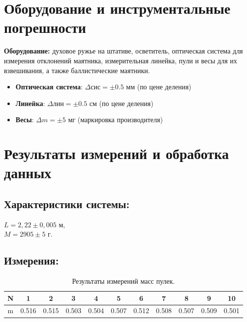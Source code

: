 \documentclass[
	a4paper, %
	12pt, %
]{article}
\begin{document}
	\section{Оборудование и инструментальные погрешности}
	\textbf{Оборудование:} духовое ружье на штативе, осветитель, оптическая система для измерения отклонений маятника, измерительная линейка, пули и весы для их взвешивания, а также баллистические маятники.
	\begin{itemize}
		\item \textbf{Оптическая система}: $\Delta \text{сис} = \pm0.5$ мм (по цене деления)
		\item \textbf{Линейка}: $\Delta \text{лин} = \pm0.5$ см (по цене деления)
		\item \textbf{Весы}: $\Delta m = \pm{5}$ мг (маркировка производителя)
	\end{itemize}
	
	\section{Результаты измерений и обработка данных}
	
	\subsection{Характеристики системы:}
	
	$L = 2,22\pm 0,005$ м,\\
	$M=2905\pm5$ г.
	
	\subsection{Измерения:}
	\newpage
	\begin{table}[h]
		\centering
		\begin{tabular}{|c|c|c|c|c|c|c|c|c|c|c|}
			\hline
			N \text{изм.} & 1 & 2 & 3 & 4 & 5 & 6 & 7 & 8 & 9 & 10  \\
			\hline
			m\text{, г} & 0.516 & 0.515 & 0.503 & 0.504 & 0.507 & 0.512 & 0.508 & 0.507 & 0.509 & 0.501 \\
			\hline
		\end{tabular}
		\caption{Результаты измерений масс пулек.}
		\label{table:1}
	\end{table}
	
	
\end{document}
